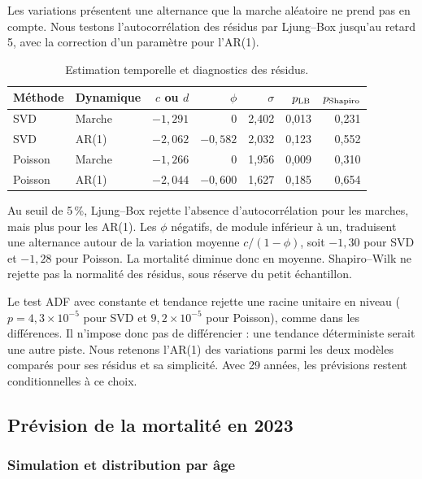 \documentclass[11pt,a4paper]{article}
\begin{document}
Les variations présentent une alternance que la marche aléatoire ne prend pas en compte. Nous testons l'autocorrélation des résidus par Ljung--Box jusqu'au retard 5, avec la correction d'un paramètre pour l'AR(1).
\begin{table}[H]\centering\small
\caption{Estimation temporelle et diagnostics des résidus.}
\begin{tabular}{llrrrrr}\toprule
Méthode & Dynamique & $c$ ou $d$ & $\phi$ & $\sigma$ & $p_{\rm LB}$ & $p_{\rm Shapiro}$\\\midrule
SVD & Marche & $-1,291$ & 0 & 2,402 & 0,013 & 0,231\\
SVD & AR(1) & $-2,062$ & $-0,582$ & 2,032 & 0,123 & 0,552\\
Poisson & Marche & $-1,266$ & 0 & 1,956 & 0,009 & 0,310\\
Poisson & AR(1) & $-2,044$ & $-0,600$ & 1,627 & 0,185 & 0,654\\\bottomrule
\end{tabular}\label{tab:temps}
\end{table}

Au seuil de 5\,\%, Ljung--Box rejette l'absence d'autocorrélation pour les marches, mais plus pour les AR(1). Les $\phi$ négatifs, de module inférieur à un, traduisent une alternance autour de la variation moyenne $c/(1-\phi)$, soit $-1,30$ pour SVD et $-1,28$ pour Poisson. La mortalité diminue donc en moyenne. Shapiro--Wilk ne rejette pas la normalité des résidus, sous réserve du petit échantillon.

Le test ADF avec constante et tendance rejette une racine unitaire en niveau ($p=4,3\times10^{-5}$ pour SVD et $9,2\times10^{-5}$ pour Poisson), comme dans les différences. Il n'impose donc pas de différencier : une tendance déterministe serait une autre piste. Nous retenons l'AR(1) des variations parmi les deux modèles comparés pour ses résidus et sa simplicité. Avec 29 années, les prévisions restent conditionnelles à ce choix.

\newpage
\subsection{Prévision de la mortalité en 2023}
\subsubsection{Simulation et distribution par âge}
\end{document}
